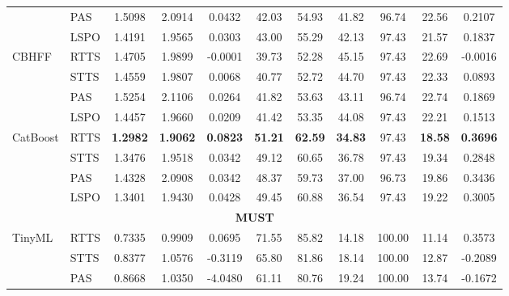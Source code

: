\documentclass{article}
\begin{document}
{\begin{longtable}{llccccccccc}
& PAS
& 1.5098 & 2.0914 & 0.0432
& 42.03 & 54.93 & 41.82 & 96.74 & 22.56 & 0.2107 \\

& LSPO
& 1.4191 & 1.9565 & 0.0303
& 43.00 & 55.29 & 42.13 & 97.43 & 21.57 & 0.1837 \\

\addlinespace

CBHFF
& RTTS
& 1.4705 & 1.9899 & -0.0001
& 39.73 & 52.28 & 45.15 & 97.43 & 22.69 & -0.0016 \\

& STTS
& 1.4559 & 1.9807 & 0.0068
& 40.77 & 52.72 & 44.70 & 97.43 & 22.33 & 0.0893 \\

& PAS
& 1.5254 & 2.1106 & 0.0264
& 41.82 & 53.63 & 43.11 & 96.74 & 22.74 & 0.1869 \\

& LSPO
& 1.4457 & 1.9660 & 0.0209
& 41.42 & 53.35 & 44.08 & 97.43 & 22.21 & 0.1513 \\

\addlinespace

CatBoost
& RTTS
& \textbf{1.2982} & \textbf{1.9062} & \textbf{0.0823}
& \textbf{51.21} & \textbf{62.59} & \textbf{34.83} & 97.43 & \textbf{18.58} & \textbf{0.3696} \\

& STTS
& 1.3476 & 1.9518 & 0.0342
& 49.12 & 60.65 & 36.78 & 97.43 & 19.34 & 0.2848 \\

& PAS
& 1.4328 & 2.0908 & 0.0342
& 48.37 & 59.73 & 37.00 & 96.73 & 19.86 & 0.3436 \\

& LSPO
& 1.3401 & 1.9430 & 0.0428
& 49.45 & 60.88 & 36.54 & 97.43 & 19.22 & 0.3005 \\



\midrule
\multicolumn{11}{c}{\textbf{MUST}} \\
\midrule

TinyML
& RTTS
& 0.7335 & 0.9909 & 0.0695
& 71.55 & 85.82 & 14.18 & 100.00 & 11.14 & 0.3573 \\

& STTS
& 0.8377 & 1.0576 & -0.3119
& 65.80 & 81.86 & 18.14 & 100.00 & 12.87 & -0.2089 \\

& PAS
& 0.8668 & 1.0350 & -4.0480
& 61.11 & 80.76 & 19.24 & 100.00 & 13.74 & -0.1672 \\


\end{longtable}}
\end{document}
